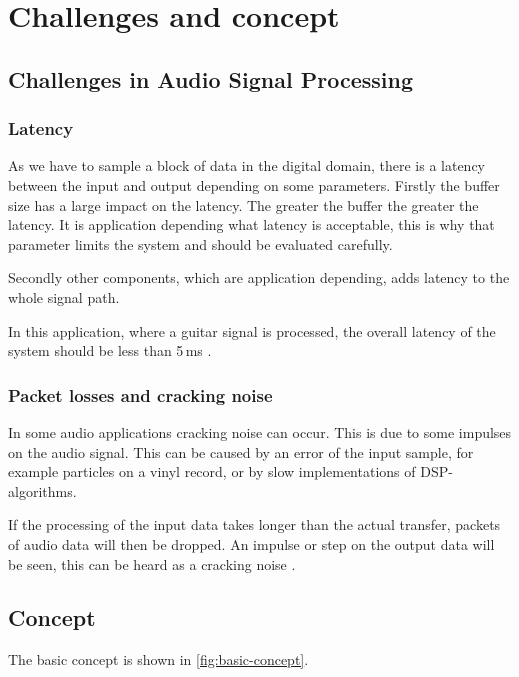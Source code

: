 \section{Challenges and concept}

\subsection{Challenges in Audio Signal Processing}

\subsubsection{Latency}

As we have to sample a block of data in the digital domain, there is a latency between the input and output
depending on some parameters. Firstly the buffer size has a large impact on the latency. The greater the buffer the
greater the latency. It is application depending what latency is acceptable, this is why that parameter
limits the system and should be evaluated carefully.

Secondly other components, which are application depending, adds latency to the whole signal path.

In this application, where a guitar signal is processed, the overall latency of the system should be less
than 5\,ms \cite{beckmann_dsp}.

\subsubsection{Packet losses and cracking noise}

In some audio applications cracking noise can occur. This is due to
some impulses on the audio signal. This can be caused by an error of the input sample, for example particles
on a vinyl record, or by slow implementations of \ac{DSP}-algorithms.

If the processing of the input data takes longer than the actual transfer, packets of audio data will
then be dropped. An impulse or step on the output data will be seen, this can be heard as a cracking noise
\cite{stotz_audio_video}.

\subsection{Concept}

The basic concept is shown in \autoref{fig:basic-concept}.

